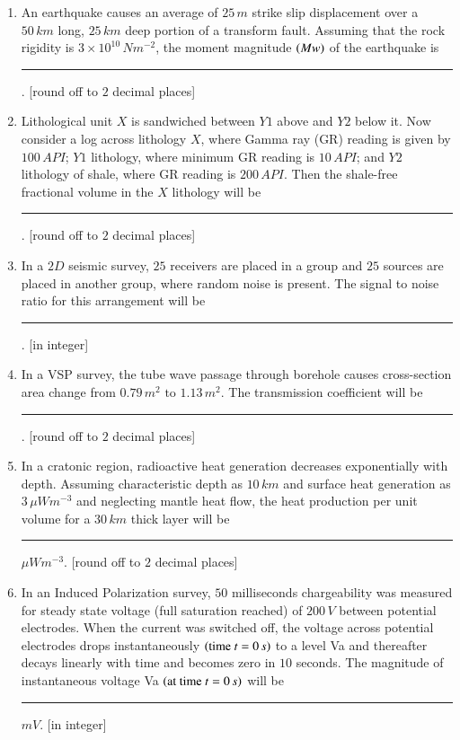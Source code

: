 \documentclass[journal,12pt,onecolumn]{IEEEtran}
\theoremstyle{remark}
\begin{document}
\begin{enumerate}
    \item An earthquake causes an average of $25\,m$ strike slip displacement over a $50\,km$ long, $25\,km$ deep portion of a transform fault. Assuming that the rock rigidity is $3 \times 10^{10}\, Nm^{-2}$, the moment magnitude $\left(Mw\right)$ of the earthquake is \rule{3cm}{0.15mm}. [round off to $2$ decimal places] \hfill{}
    
    \item Lithological unit $X$ is sandwiched between $Y1$ above and $Y2$ below it. Now consider a log across lithology $X$, where Gamma ray (GR) reading is given by $100\,API$; $Y1$ lithology, where minimum GR reading is $10\,API$; and $Y2$ lithology of shale, where GR reading is $200\,API$. Then the shale-free fractional volume in the $X$ lithology will be \rule{3cm}{0.15mm}. [round off to $2$ decimal places] \hfill{}
    
    \item In a $2D$ seismic survey, $25$ receivers are placed in a group and $25$ sources are placed in another group, where random noise is present. The signal to noise ratio for this arrangement will be \rule{3cm}{0.15mm}. [in integer]  \hfill{}
    
    \item In a VSP survey, the tube wave passage through borehole causes cross-section area change from $0.79\,m^2 \text{ to } 1.13\,m^2$. The transmission coefficient will be \rule{3cm}{0.15mm}. [round off to $2$ decimal places]  \hfill{}
    
    \item In a cratonic region, radioactive heat generation decreases exponentially with depth. Assuming characteristic depth as $10\,km$ and surface heat generation as $3\,\mu W m ^{-3}$ and neglecting mantle heat flow, the heat production per unit volume for a $30\,km$ thick layer will be \rule{3cm}{0.15mm} $\mu W m^{-3}$. [round off to $2$ decimal places] \hfill{}
    
    \item In an Induced Polarization survey, $50$ milliseconds chargeability was measured for steady state voltage (full saturation reached) of $200\,V$ between potential electrodes. When the current was switched off, the voltage across potential electrodes drops instantaneously $\left(\text{time } t = 0\,s\right)$ to a level Va and thereafter decays linearly with time and becomes zero in $10$ seconds. The magnitude of instantaneous voltage Va $\left(\text{at time } t = 0\,s\right)$ will be \rule{3cm}{0.15mm} $mV$. [in integer] \hfill{}
    

\end{enumerate}
\end{document}
